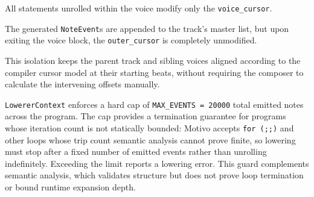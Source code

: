All statements unrolled within the voice modify only the \texttt{voice\_cursor}.

The generated \texttt{NoteEvent}s are appended to the track's master list, but upon exiting the
voice block, the
\texttt{outer\_cursor} is completely unmodified.

This isolation keeps the parent track and sibling voices aligned according to the compiler cursor model at
their starting beats, without requiring the composer to calculate the intervening offsets manually.

\texttt{LowererContext} enforces a hard cap of \texttt{MAX\_EVENTS = 20000} total emitted notes across the program.
The cap provides a termination guarantee for programs whose iteration count is not statically bounded: Motivo accepts
\texttt{for (;;)} and other loops whose trip count semantic analysis cannot prove finite, so lowering must stop after a
fixed number of emitted events rather than unrolling indefinitely.
Exceeding the limit reports a lowering error.
This guard complements semantic analysis, which validates structure but does not prove loop termination or bound
runtime expansion depth.
